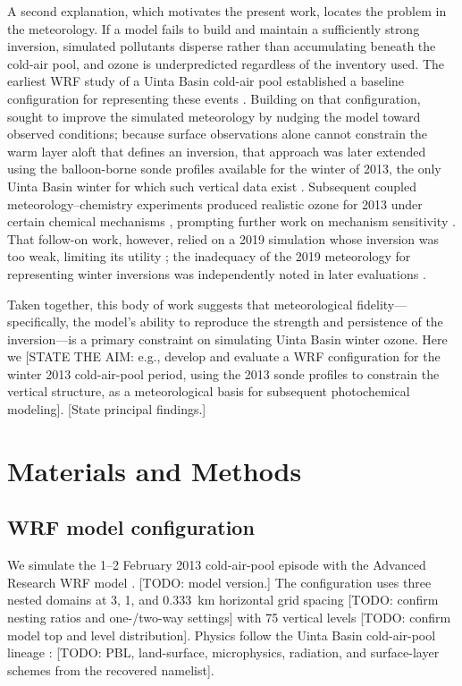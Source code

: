 \documentclass[air,article,submit,pdftex,moreauthors]{Definitions/mdpi}
\begin{document}
A second explanation, which motivates the present work, locates the
problem in the meteorology. If a model fails to build and maintain a
sufficiently strong inversion, simulated pollutants disperse rather than
accumulating beneath the cold-air pool, and ozone is underpredicted
regardless of the inventory used. The earliest WRF study of a Uinta Basin
cold-air pool established a baseline configuration for representing these
events \citep{neemann2015}. Building on that configuration,
\citet{tran2018} sought to improve the simulated meteorology by nudging
the model toward observed conditions; because surface observations alone
cannot constrain the warm layer aloft that defines an inversion, that
approach was later extended using the balloon-borne sonde profiles
available for the winter of 2013, the only Uinta Basin winter for which
such vertical data exist \citep{ubaqr2019}. Subsequent coupled
meteorology--chemistry experiments produced realistic ozone for 2013 under
certain chemical mechanisms \citep{ubaqr2020}, prompting further work on
mechanism sensitivity \citep{ramboll2023}. That follow-on work, however,
relied on a 2019 simulation whose inversion was too weak, limiting its
utility \citep{topdown2023}; the inadequacy of the 2019 meteorology for
representing winter inversions was independently noted in later evaluations
\citep{rmp2022}.

Taken together, this body of work suggests that meteorological
fidelity---specifically, the model's ability to reproduce the strength and
persistence of the inversion---is a primary constraint on simulating Uinta
Basin winter ozone. Here we [STATE THE AIM: e.g., develop and evaluate a
WRF configuration for the winter 2013 cold-air-pool period, using the 2013
sonde profiles to constrain the vertical structure, as a meteorological
basis for subsequent photochemical modeling]. [State principal findings.]

\section{Materials and Methods}

\subsection{WRF model configuration}
We simulate the 1--2 February 2013 cold-air-pool episode with the Advanced
Research WRF model \citep{skamarock2021wrf}.
[TODO: model version.]
The configuration uses three nested domains at 3, 1, and 0.333~km horizontal
grid spacing
[TODO: confirm nesting ratios and one-/two-way settings]
with 75 vertical levels
[TODO: confirm model top and level distribution].
Physics follow the Uinta Basin cold-air-pool lineage
\citep{neemann2015,tran2018}:
[TODO: PBL, land-surface, microphysics, radiation, and surface-layer schemes
from the recovered namelist].
\end{document}
